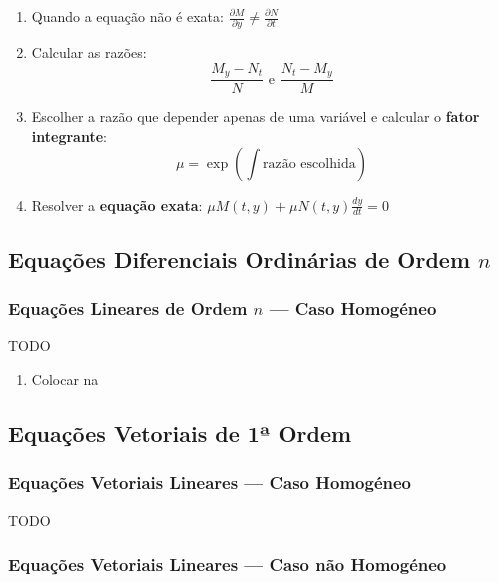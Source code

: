 \documentclass[11pt, a4paper]{article}
\begin{document}
\begin{enumerate}
    \item Quando a equação não é exata:
          $\displaystyle \frac{\partial M}{\partial y} \neq
              \frac{\partial N}{\partial t}$
    \item Calcular as razões:
          \begin{equation*}
              \frac{M_y - N_t}{N} \text{\ \ \ \ e \ \ \ } \frac{N_t - M_y}{M}
          \end{equation*}
    \item Escolher a razão que depender apenas de uma variável e calcular o
          \textbf{fator integrante}:
          \begin{equation*}
              \mu = \exp\left(\int \text{razão escolhida}\right)
          \end{equation*}
    \item Resolver a \textbf{equação exata}:
          $\displaystyle \mu M(t,y) + \mu N(t, y)\frac{dy}{dt} = 0$

\end{enumerate}

\subsection{Equações Diferenciais Ordinárias de Ordem $n$}

\subsubsection{Equações Lineares de Ordem $n$ — Caso Homogéneo}

TODO

\begin{enumerate}
    \item Colocar na
\end{enumerate}

\subsection{Equações Vetoriais de 1ª Ordem}

\subsubsection{Equações Vetoriais Lineares — Caso Homogéneo}

TODO

\subsubsection{Equações Vetoriais Lineares — Caso não Homogéneo}
\end{document}
